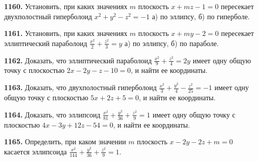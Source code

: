 \textbf{1160.} Установить, при каких значениях $m$ плоскость $x+m z-1=0$ пересекает двухполостный гиперболоид $x^2+y^2-z^2=-1$ а) по эллипсу, б) по гиперболе.

\textbf{1161.} Установить, при каких значениях $m$ плоскость $x+m y-2=0$ пересекает эллиптический параболоид $\frac{x^2}{2}+\frac{z^2}{3}=y$ а) по эллипсу, б) по параболе.

\textbf{1162.} Доказать, что эллиптический параболоид $\frac{x^2}{9}+\frac{z^2}{4}=2 y$ имеет одну общую точку с плоскостью $2 x-2 y-z-10=0$, и найти ее координаты.

\textbf{1163.} Доказать, что двухполостный гиперболоид $\frac{x^2}{3}+\frac{y^2}{4}-\frac{z^2}{25}=-1$ имеет одну общую точку с плоскостью $5 x+2 z+5=0$, и найти ее координаты.

\textbf{1164.} Доказать, что эллипсоид $\frac{x^2}{81}+\frac{y^2}{36}+\frac{z^2}{9}=1$ имеет одну общую точку с плоскостью $4 x-3 y+12 z-54=0$, и найти ее координаты.

\textbf{1165.} Определить, при каком значении $m$ плоскость $x-2 y-2 z+m=0$ касается эллипсоида $\frac{x^2}{144}+\frac{y^2}{36}+\frac{z^2}{9}=1$.